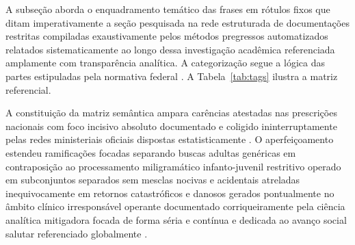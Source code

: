 \documentclass[12pt]{article}
\begin{document}
A subseção aborda o enquadramento temático das frases em rótulos fixos que ditam imperativamente a seção pesquisada na rede estruturada de documentações restritas compiladas exaustivamente pelos métodos pregressos automatizados relatados sistematicamente ao longo dessa investigação acadêmica referenciada amplamente com transparência analítica. A categorização segue a lógica das partes estipuladas pela normativa federal \cite{pinto2013bulas}. A Tabela~\ref{tab:tags} ilustra a matriz referencial.

A constituição da matriz semântica ampara carências atestadas nas prescrições nacionais com foco incisivo absoluto documentado e coligido ininterruptamente pelas redes ministeriais oficiais dispostas estatisticamente \cite{anvisa2023ranking}. O aperfeiçoamento estendeu ramificações focadas separando buscas adultas genéricas em contraposição ao processamento miligramático infanto-juvenil restritivo operado em subconjuntos separados sem mesclas nocivas e acidentais atreladas inequivocamente em retornos catastróficos e danosos gerados pontualmente no âmbito clínico irresponsável operante documentado corriqueiramente pela ciência analítica mitigadora focada de forma séria e contínua e dedicada ao avanço social salutar referenciado globalmente \cite{ji2023survey}.
\end{document}
